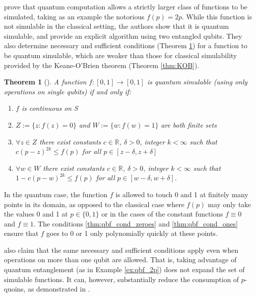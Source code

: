\documentclass{article}
\newtheorem{thm}{Theorem}
\theoremstyle{definition}
\begin{document}
\citet{dale2015} prove that quantum computation allows a strictly larger class of functions to be simulated, taking as an example the notorious $f(p)=2p$. While this function is not simulable in the classical setting, the authors show that it is quantum simulable, and provide an explicit algorithm using two entangled qubits.
They also determine necessary and sufficient conditions (Theorem \ref{thm:qbf_simulable}) for a function to be quantum simulable, which are weaker than those for classical simulability provided by the Keane-O'Brien theorem (Theorem \ref{thm:KOB}).


\begin{thm}[{\citet[Theorem 1]{dale2015}}]\label{thm:qbf_simulable}
A function $f:[0,1]\to[0,1]$ %
is quantum simulable (using only operations on single qubits) if and only if:
\begin{enumerate}[label=(\alph*)]
\item $f$ is continuous on S
\item $Z:=\{z:f(z)=0\}$ and $W:=\{w:f(w)=1\}$ are both finite sets
\item\label{thm:qbf_cond_zeroes} $\forall z\in Z$ there exist constants $c\in\mathbb{R}$, $\delta>0$, integer $k<\infty$ such that $c(p-z)^{2k} \leq f(p)$ for all $p \in [z-\delta, z+\delta]$
\item\label{thm:qbf_cond_ones} $\forall w\in W$ there exist constants $c\in\mathbb{R}$, $\delta>0$, integer $k<\infty$ such that $1 - c(p-w)^{2k} \leq f(p)$ for all $p \in [w-\delta, w+\delta]$.
\end{enumerate}
\end{thm}
In the quantum case, the function $f$ is allowed to touch 0 and 1 at finitely many points in its domain, as opposed to the classical case where $f(p)$ may only take the values 0 and 1 at $p\in\{0,1\}$ or in the cases of the constant functions $f\equiv 0$ and $f\equiv 1$.
The conditions \ref{thm:qbf_cond_zeroes} and \ref{thm:qbf_cond_ones} ensure that $f$ goes to 0 or 1 only polynomially quickly at these points.

\citet{dale2015} also claim that the same necessary and sufficient conditions apply even when operations on more than one qubit are allowed. That is, taking advantage of quantum entanglement (as in Example \ref{ex:qbf_2p}) does not expand the set of simulable functions. It can, however, substantially reduce the consumption of $p$-quoins, as demonstrated in \citet{patel2018}.
\end{document}
